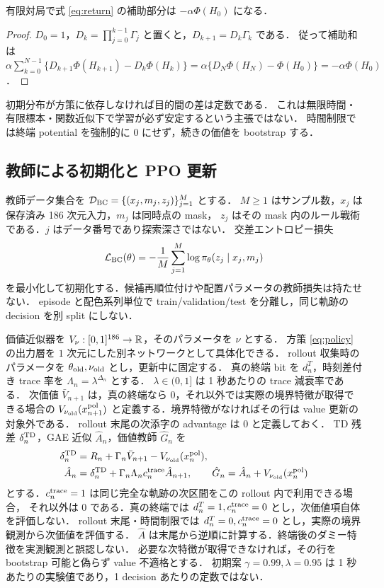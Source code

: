\begin{proposition}\label{prop:potential}
有限対局で式 \eqref{eq:return} の補助部分は $-\alpha\Phi(H_0)$ になる．
\end{proposition}
\begin{proof}
$D_0=1$，$D_k=\prod_{j=0}^{k-1}\Gamma_j$ と置くと，$D_{k+1}=D_k\Gamma_k$ である．
従って補助和は
$\alpha\sum_{k=0}^{N-1}\{D_{k+1}\Phi(H_{k+1})-D_k\Phi(H_k)\}
=\alpha\{D_N\Phi(H_N)-\Phi(H_0)\}=-\alpha\Phi(H_0)$．
\end{proof}
初期分布が方策に依存しなければ目的間の差は定数である．
これは無限時間・有限標本・関数近似下で学習が必ず安定するという主張ではない．
時間制限では終端 potential を強制的に $0$ にせず，続きの価値を bootstrap する．

\subsection{教師による初期化と PPO 更新}
教師データ集合を $\mathcal D_{\rm BC}=\{(x_j,m_j,z_j)\}_{j=1}^{M}$ とする．
$M\ge1$ はサンプル数，$x_j$ は保存済み 186 次元入力，$m_j$ は同時点の mask，
$z_j$ はその mask 内のルール戦術である．$j$ はデータ番号であり探索深さではない．
交差エントロピー損失
\begin{equation}\label{eq:bc}
 \mathcal L_{\rm BC}(\theta)=-\frac1M\sum_{j=1}^M\log\pi_\theta(z_j\mid x_j,m_j)
\end{equation}
を最小化して初期化する．候補再順位付けや配置パラメータの教師損失は持たせない．
episode と配色系列単位で train/validation/test を分離し，同じ軌跡の decision を別 split にしない．

価値近似器を $V_\nu:[0,1]^{186}\to\mathbb{R}$，そのパラメータを $\nu$ とする．
方策 \eqref{eq:policy} の出力層を $1$ 次元にした別ネットワークとして具体化できる．
rollout 収集時のパラメータを $\theta_{\rm old},\nu_{\rm old}$ とし，更新中に固定する．
真の終端 bit を $d_n^T$，時刻差付き trace 率を $\Lambda_n=\lambda^{\Delta_n}$ とする．
$\lambda\in(0,1]$ は 1 秒あたりの trace 減衰率である．
次価値 $\bar V_{n+1}$ は，真の終端なら $0$，それ以外では実際の境界特徴が取得できる場合の
$V_{\nu_{\rm old}}(x_{n+1}^{\rm pol})$ と定義する．境界特徴がなければその行は value 更新の対象外である．
rollout 末尾の次添字の advantage は $0$ と定義しておく．
TD 残差 $\delta_n^{\rm TD}$，GAE 近似 $\hat A_n$，価値教師 $\hat G_n$ を
\begin{align}
 \delta_n^{\rm TD}&=R_n+\Gamma_n\bar V_{n+1}
                            -V_{\nu_{\rm old}}(x_n^{\rm pol}),\label{eq:td}\\
 \hat A_n&=\delta_n^{\rm TD}+\Gamma_n\Lambda_n c_n^{\rm trace}\hat A_{n+1},
 \qquad \hat G_n=\hat A_n+V_{\nu_{\rm old}}(x_n^{\rm pol})\label{eq:gae}
\end{align}
とする．$c_n^{\rm trace}=1$ は同じ完全な軌跡の次区間をこの rollout 内で利用できる場合，
それ以外は $0$ である．真の終端では $d_n^T=1,c_n^{\rm trace}=0$ とし，次価値項自体を評価しない．
rollout 末尾・時間制限では $d_n^T=0,c_n^{\rm trace}=0$ とし，実際の境界観測から次価値を評価する．
$\hat A$ は末尾から逆順に計算する．終端後のダミー特徴を実測観測と誤認しない．
必要な次特徴が取得できなければ，その行を bootstrap 可能と偽らず value 不適格とする．
初期案 $\gamma=0.99,\lambda=0.95$ は 1 秒あたりの実験値であり，1 decision あたりの定数ではない．

